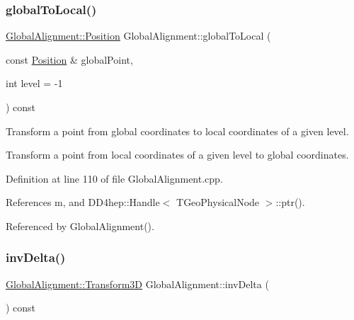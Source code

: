 \subsubsection{\texorpdfstring{global\+To\+Local()}{globalToLocal()}}
{\footnotesize\ttfamily \hyperlink{class_d_d4hep_1_1_alignments_1_1_global_alignment_a9cd5167ec3a33a95ca76a9c7fe06271e}{Global\+Alignment\+::\+Position} Global\+Alignment\+::global\+To\+Local (\begin{DoxyParamCaption}\item[{const \hyperlink{class_d_d4hep_1_1_alignments_1_1_global_alignment_a9cd5167ec3a33a95ca76a9c7fe06271e}{Position} \&}]{global\+Point,  }\item[{int}]{level = {\ttfamily -\/1} }\end{DoxyParamCaption}) const}



Transform a point from global coordinates to local coordinates of a given level. 

Transform a point from local coordinates of a given level to global coordinates. 

Definition at line 110 of file Global\+Alignment.\+cpp.



References m, and D\+D4hep\+::\+Handle$<$ T\+Geo\+Physical\+Node $>$\+::ptr().



Referenced by Global\+Alignment().

\hypertarget{class_d_d4hep_1_1_alignments_1_1_global_alignment_a8f16262db0af3dc12e6372fa02daf67b}{}\label{class_d_d4hep_1_1_alignments_1_1_global_alignment_a8f16262db0af3dc12e6372fa02daf67b} 
\subsubsection{\texorpdfstring{inv\+Delta()}{invDelta()}}
{\footnotesize\ttfamily \hyperlink{class_d_d4hep_1_1_alignments_1_1_global_alignment_a328240cbc53ba92424336a5898ba49d3}{Global\+Alignment\+::\+Transform3D} Global\+Alignment\+::inv\+Delta (\begin{DoxyParamCaption}{ }\end{DoxyParamCaption}) const}



